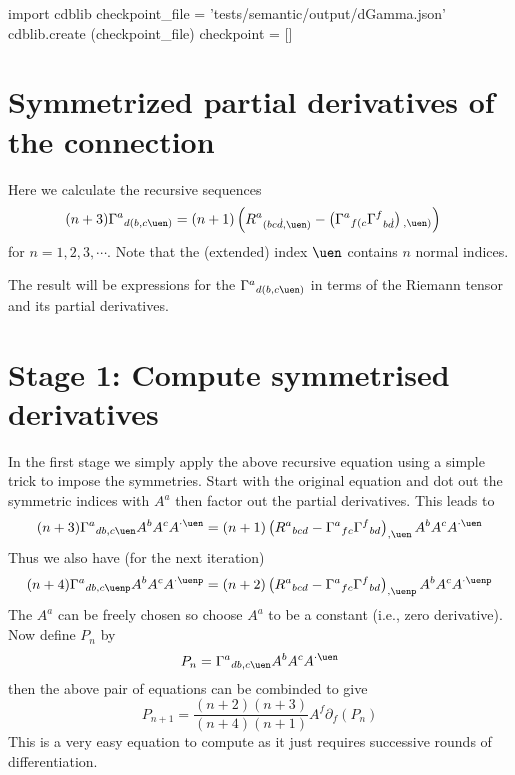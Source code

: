 \documentclass[12pt]{cdblatex}
\begin{document}

\bgroup
{}
\begin{cadabra}
   import cdblib
   checkpoint_file = 'tests/semantic/output/dGamma.json'
   cdblib.create (checkpoint_file)
   checkpoint = []
\end{cadabra}
\egroup

\section*{Symmetrized partial derivatives of the connection}

Here we calculate the recursive sequences
\begin{align*}
(n+3)\Gamma^a{}_{d(b,c\uen)}
   &= (n+1)\left(R^a{}_{(bc\Dot d,\uen)}
    - \left(\Gamma^a{}_{f(c}\Gamma^f{}_{b{\Dot d}}\right){\vphantom{\Gamma}}_{,\uen)}\right)
\end{align*}
for $n=1,2,3,\cdots$. Note that the (extended) index $\uen$ contains $n$ normal indices.

The result will be expressions for the $\Gamma^a{}_{d(b,c\uen)}$ in terms of the Riemann tensor and its
partial derivatives.

\section*{Stage 1: Compute symmetrised derivatives}

In the first stage we simply apply the above recursive equation using a simple trick to impose
the symmetries. Start with the original equation and dot out the symmetric indices with $A^a$ then
factor out the partial derivatives. This leads to
\begin{equation}
(n+3)\Gamma^a{}_{db,c\uen} A^b A^c A^{\cdot\uen}
    = (n+1)\left(R^a{}_{bcd}
    - \Gamma^a{}_{fc}\Gamma^f{}_{bd}\right)_{,\uen} A^b A^c A^{\cdot\uen}
\end{equation}
Thus we also have (for the next iteration)
\begin{equation}
(n+4)\Gamma^a{}_{db,c\uenp} A^b A^c A^{\cdot\uenp}
    = (n+2)\left(R^a{}_{bcd}
    - \Gamma^a{}_{fc}\Gamma^f{}_{bd}\right)_{,\uenp} A^b A^c A^{\cdot\uenp}
\end{equation}
The $A^a$ can be freely chosen so choose $A^a$ to be a constant (i.e., zero derivative). Now
define $P_n$ by
\begin{equation}
   P_n = \Gamma^a{}_{db,c\uen} A^b A^c A^{\cdot\uen}
\end{equation}
then the above pair of equations can be combinded to give
\begin{equation}
   P_{n+1} = \frac{(n+2)(n+3)}{(n+4)(n+1)} A^f\partial_f\left(P_n\right)
\end{equation}
This is a very easy equation to compute as it just requires successive rounds of differentiation.
\end{document}

